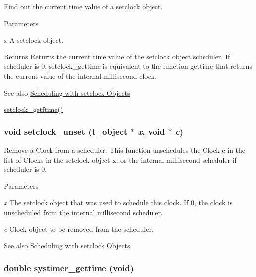 Find out the current time value of a setclock object. 
\begin{DoxyParams}{Parameters}
\item[{\em x}]A setclock object. \end{DoxyParams}
\begin{DoxyReturn}{Returns}
Returns the current time value of the setclock object scheduler. If scheduler is 0, setclock\_\-gettime is equivalent to the function gettime that returns the current value of the internal millisecond clock. 
\end{DoxyReturn}
\begin{DoxySeeAlso}{See also}
\hyperlink{group__clocks_setclock}{Scheduling with setclock Objects} 

\hyperlink{group__clocks_gafd1993dc69a6232cf28683961c97b9e4}{setclock\_\-getftime()} 
\end{DoxySeeAlso}
\hypertarget{group__clocks_gafbc6d9baa43a561b1840b8b4ce6bed5c}{
\subsubsection[{setclock\_\-unset}]{\setlength{\rightskip}{0pt plus 5cm}void setclock\_\-unset ({\bf t\_\-object} $\ast$ {\em x}, \/  void $\ast$ {\em c})}}
\label{group__clocks_gafbc6d9baa43a561b1840b8b4ce6bed5c}


Remove a Clock from a scheduler. This function unschedules the Clock c in the list of Clocks in the setclock object x, or the internal millisecond scheduler if scheduler is 0.


\begin{DoxyParams}{Parameters}
\item[{\em x}]The setclock object that was used to schedule this clock. If 0, the clock is unscheduled from the internal millisecond scheduler. \item[{\em c}]Clock object to be removed from the scheduler. \end{DoxyParams}
\begin{DoxySeeAlso}{See also}
\hyperlink{group__clocks_setclock}{Scheduling with setclock Objects} 
\end{DoxySeeAlso}
\hypertarget{group__clocks_ga11fd7e2733b0186ff82e9766db3031e7}{
\subsubsection[{systimer\_\-gettime}]{\setlength{\rightskip}{0pt plus 5cm}double systimer\_\-gettime (void)}}
\label{group__clocks_ga11fd7e2733b0186ff82e9766db3031e7}


